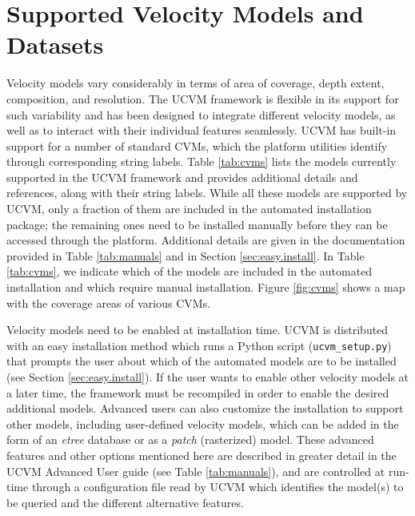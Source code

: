 




\section{Supported Velocity Models and Datasets}
\label{sec:cvms}

Velocity models vary considerably in terms of area of coverage, depth extent, composition, and resolution. The UCVM framework is flexible in its support for such variability and has been designed to integrate different velocity models, as well as to interact with their individual features seamlessly. UCVM has built-in support for a number of standard CVMs, which the platform utilities identify through corresponding string labels. Table \ref{tab:cvms} lists the models currently supported in the UCVM framework and provides additional details and references, along with their string labels. While all these models are supported by UCVM, only a fraction of them are included in the automated installation package; the remaining ones need to be installed manually before they can be accessed through the platform. Additional details are given in the documentation provided in Table \ref{tab:manuals} and in Section \ref{sec:easy.install}. In Table \ref{tab:cvms}, we indicate which of the models are included in the automated installation and which require manual installation. Figure \ref{fig:cvms} shows a map with the coverage areas of various CVMs.

Velocity models need to be enabled at installation time. UCVM is distributed with an easy installation method which runs a Python script (\texttt{ucvm\_setup.py}) that prompts the user about which of the automated models are to be installed (see Section \ref{sec:easy.install}). If the user wants to enable other velocity models at a later time, the framework must be recompiled in order to enable the desired additional models. Advanced users can also customize the installation to support other models, including user-defined velocity models, which can be added in the form of an \textit{etree} \citep{Tu_2003_Tech} database or as a \textit{patch} (rasterized) model. These advanced features and other options mentioned here are described in greater detail in the UCVM Advanced User guide (see Table \ref{tab:manuals}), and are controlled at run-time through a configuration file read by UCVM which identifies the model(s) to be queried and the different alternative features.

